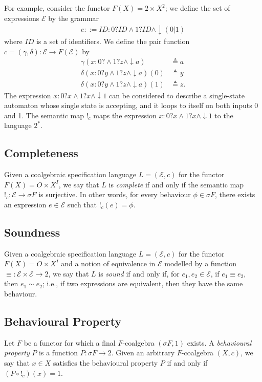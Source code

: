 For example, consider the functor $F(X)=2\times X^2$; we define the set of expressions $\mathcal{E}$ by the grammar
\begin{align}
    e::= ID:0?ID\land1?ID\land\downarrow (0|1)
\end{align}
where $ID$ is a set of identifiers. We define the pair function $c=(\gamma,\delta)\colon \mathcal{E}\rightarrow F(\mathcal{E})$ by 
\begin{align*}
    \gamma(x:0?\land1?z\land\downarrow a)&\triangleq a\\
    \delta(x:0?y\land1?z\land\downarrow a)(0)&\triangleq y\\
    \delta(x:0?y\land1?z\land\downarrow a)(1)&\triangleq z.
\end{align*}
The expression $x:0?x\land1?x\land\downarrow 1$ can be considered to describe a single-state automaton whose single state is  accepting, and it loops to itself on both inputs 0 and 1. The semantic map $!_c$ maps the expression $x:0?x\land1?x\land\downarrow 1$ to the language $2^*$.%

\subsection{Completeness}
Given a coalgebraic specification language $L=(\mathcal{E},c)$ for the functor $F(X)=O\times X^I$, we say that $L$ is \emph{complete} if and only if the semantic map $!_c\colon \mathcal{E}\rightarrow \sigma F$ is surjective. In other words, for every behaviour $\phi\in \sigma F$, there exists an expression $e\in \mathcal{E}$ such that $!_c(e)=\phi$.

\subsection{Soundness}
Given a coalgebraic specification language $L=(\mathcal{E},c)$ for the functor $F(X)=O\times X^I$ and a notion of equivalence in $\mathcal{E}$ modelled by a function $\equiv \colon \mathcal{E}\times \mathcal{E}\rightarrow 2$, we say that $L$ is \emph{sound} if and only if, for $e_1, e_2\in \mathcal{E}$, if $e_1\equiv e_2$, then $e_1\sim e_2$; i.e., if two expressions are equivalent, then they have the same behaviour.


\subsection{Behavioural Property}
\label{sec:preliminaries:BehaviouralProperty}
Let $F$ be a functor for which a final $F$-coalgebra $(\sigma F, 1)$ exists. A \emph{behavioural property} $P$ is a function $P\colon \sigma F\rightarrow 2$. Given an arbitrary $F$-coalgebra $(X,c)$, we say that $x\in X$ satisfies the behavioural property $P$ if and only if $(P\circ !_c)(x)=1$.

